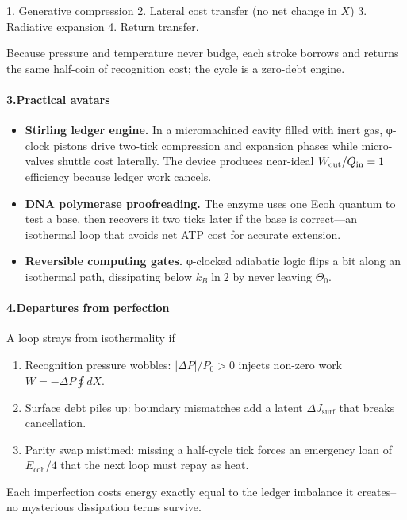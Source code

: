 \documentclass[11pt,oneside]{book}
\newcommand{\Eoh}{\ensuremath{E_{\text{coh}}}}       %
\begin{document}
1. Generative compression  
2. Lateral cost transfer (no net change in \(X\))  
3. Radiative expansion  
4. Return transfer.

Because pressure and temperature never budge, each stroke borrows and
returns the same half-coin of recognition cost; the cycle is a
zero-debt engine.

\paragraph*{3.\;Practical avatars}

\begin{itemize}
\item \textbf{Stirling ledger engine.}  
  In a micromachined cavity filled with inert gas, φ-clock pistons drive
  two-tick compression and expansion phases while micro-valves shuttle
  cost laterally.  The device produces near-ideal
  \(W_{\rm out}/Q_{\rm in}=1\) efficiency because ledger work cancels.
\item \textbf{DNA polymerase proofreading.}  
  The enzyme uses one Ecoh quantum to test a base, then recovers it two
  ticks later if the base is correct—an isothermal loop that avoids net
  ATP cost for accurate extension.
\item \textbf{Reversible computing gates.}  
  φ-clocked adiabatic logic flips a bit along an isothermal path,
  dissipating below \(k_B\ln2\) by never leaving \(\Theta_0\).
\end{itemize}

\paragraph*{4.\;Departures from perfection}

A loop strays from isothermality if

\begin{enumerate}
\item Recognition pressure wobbles: \(|\Delta P|/P_0 > 0\) injects
      non-zero work \(W = -\Delta P\oint dX\).
\item Surface debt piles up: boundary mismatches add a latent
      \(\Delta J_{\text{surf}}\) that breaks cancellation.
\item Parity swap mistimed: missing a half-cycle tick forces an
      emergency loan of \(\Eoh/4\) that the next loop must repay as heat.
\end{enumerate}

Each imperfection costs energy exactly equal to the ledger imbalance it
creates–no mysterious dissipation terms survive.
\end{document}
